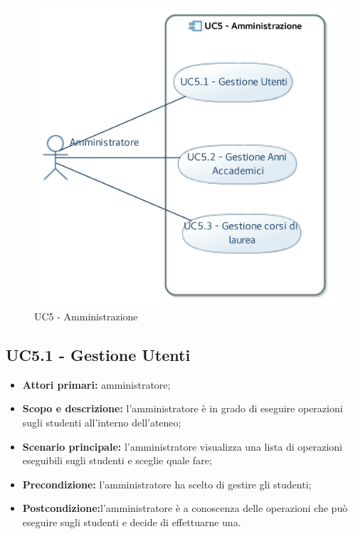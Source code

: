 \documentclass[AnalisiDeiRequisiti.tex]{subfiles}
\begin{document}
\begin{figure}[H]
	\centering
	\includegraphics[width=1.0\linewidth]{UC5.jpg}
	\caption{UC5 - Amministrazione}
	\label{fig:UC5 - Amministrazione}
\end{figure}

\subsection{UC5.1 - Gestione Utenti}
\begin{itemize}
	\item \textbf{Attori primari:} amministratore;
	\item \textbf{Scopo e descrizione:} l'amministratore è in grado di eseguire operazioni sugli studenti all'interno dell'ateneo;
	\item \textbf{Scenario principale:} l'amministratore visualizza una lista di operazioni eseguibili sugli studenti e sceglie quale fare;
	\item \textbf{Precondizione:} l'amministratore ha scelto di gestire gli studenti; 
	\item \textbf{Postcondizione:}l'amministratore è a conoscenza delle operazioni che può eseguire sugli studenti e decide di effettuarne una.
\end{itemize}
\end{document}
